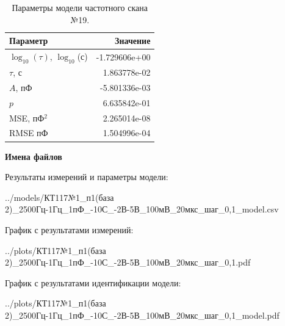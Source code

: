 \begin{table}[!ht]
    \centering
    \caption{Параметры модели частотного скана №19.}
    \begin{tabular}{|l|r|}
        \hline
        Параметр                                       & Значение                  \\ \hline
        $\log_{10}(\tau)$, $\log_{10}$(с)              & -1.729606e+00             \\ \hline
        $\tau$, с                                      & 1.863778e-02              \\ \hline
        $A$, пФ                                        & -5.801336e-03             \\ \hline
        $p$                                            & 6.635842e-01              \\ \hline
        MSE, пФ$^2$                                    & 2.265014e-08              \\ \hline
        RMSE пФ                                        & 1.504996e-04              \\ \hline
    \end{tabular}
    \label{table:frequency_scan_model_19}
\end{table}

\textbf{Имена файлов}

Результаты измерений и параметры модели:

\scriptsize../models/КТ117№1\_п1(база 2)\_2500Гц-1Гц\_1пФ\_-10С\_-2В-5В\_100мВ\_20мкс\_шаг\_0,1\_model.csv
\normalsize

График с результатами измерений:

\scriptsize../plots/КТ117№1\_п1(база 2)\_2500Гц-1Гц\_1пФ\_-10С\_-2В-5В\_100мВ\_20мкс\_шаг\_0,1.pdf
\normalsize

График с результатами идентификации модели:

\scriptsize../plots/КТ117№1\_п1(база 2)\_2500Гц-1Гц\_1пФ\_-10С\_-2В-5В\_100мВ\_20мкс\_шаг\_0,1\_model.pdf
\normalsize

